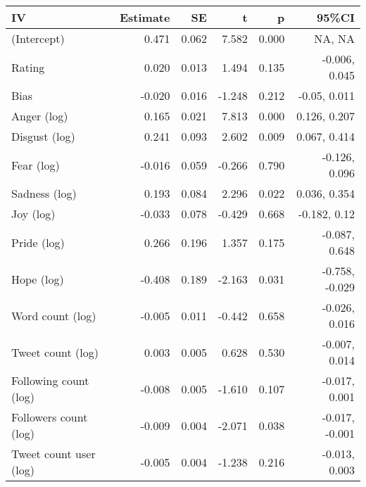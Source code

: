 
\begin{tabular}{lrrrrr}
\toprule
IV & Estimate & SE & t & p & 95\%CI\\
\midrule
(Intercept) & 0.471 & 0.062 & 7.582 & 0.000 & NA, NA\\
Rating & 0.020 & 0.013 & 1.494 & 0.135 & -0.006, 0.045\\
Bias & -0.020 & 0.016 & -1.248 & 0.212 & -0.05, 0.011\\
Anger (log) & 0.165 & 0.021 & 7.813 & 0.000 & 0.126, 0.207\\
Disgust (log) & 0.241 & 0.093 & 2.602 & 0.009 & 0.067, 0.414\\
Fear (log) & -0.016 & 0.059 & -0.266 & 0.790 & -0.126, 0.096\\
Sadness (log) & 0.193 & 0.084 & 2.296 & 0.022 & 0.036, 0.354\\
Joy (log) & -0.033 & 0.078 & -0.429 & 0.668 & -0.182, 0.12\\
Pride (log) & 0.266 & 0.196 & 1.357 & 0.175 & -0.087, 0.648\\
Hope (log) & -0.408 & 0.189 & -2.163 & 0.031 & -0.758, -0.029\\
Word count (log) & -0.005 & 0.011 & -0.442 & 0.658 & -0.026, 0.016\\
Tweet count (log) & 0.003 & 0.005 & 0.628 & 0.530 & -0.007, 0.014\\
Following count (log) & -0.008 & 0.005 & -1.610 & 0.107 & -0.017, 0.001\\
Followers count (log) & -0.009 & 0.004 & -2.071 & 0.038 & -0.017, -0.001\\
Tweet count user (log) & -0.005 & 0.004 & -1.238 & 0.216 & -0.013, 0.003\\
\bottomrule
\end{tabular}
